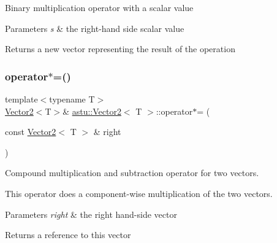 Binary multiplication operator with a scalar value


\begin{DoxyParams}{Parameters}
{\em s} & the right-\/hand side scalar value \\
\hline
\end{DoxyParams}
\begin{DoxyReturn}{Returns}
a new vector representing the result of the operation 
\end{DoxyReturn}
\mbox{\label{classastu_1_1Vector2_a3416fb656aef7113d0261533f5a8a4aa}} 
\subsubsection{\texorpdfstring{operator$\ast$=()}{operator*=()}\hspace{0.1cm}{\footnotesize\ttfamily [1/2]}}
{\footnotesize\ttfamily template$<$typename T$>$ \\
\hyperlink{classastu_1_1Vector2}{Vector2}$<$T$>$\& \hyperlink{classastu_1_1Vector2}{astu\+::\+Vector2}$<$ T $>$\+::operator$\ast$= (\begin{DoxyParamCaption}\item[{const \hyperlink{classastu_1_1Vector2}{Vector2}$<$ T $>$ \&}]{right }\end{DoxyParamCaption})\hspace{0.3cm}{\ttfamily [inline]}}

Compound multiplication and subtraction operator for two vectors.

This operator does a component-\/wise multiplication of the two vectors.


\begin{DoxyParams}{Parameters}
{\em right} & the right hand-\/side vector \\
\hline
\end{DoxyParams}
\begin{DoxyReturn}{Returns}
a reference to this vector 
\end{DoxyReturn}
\mbox{\label{classastu_1_1Vector2_a3a4e11dd85fbd0e1cda4e8b38b9aea6a}} 
